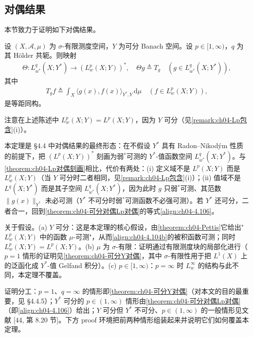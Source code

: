 \documentclass[../../main.tex]{subfiles}%
\begin{document}
\subsection{对偶结果}\label{subsection:ch04-对偶结果}

本节致力于证明如下对偶结果。

\begin{theorem}\label{theorem:ch04-弱对偶}
设 $(X,\mathcal{A},\mu)$ 为 $\sigma$-有限测度空间，$Y$ 为可分 Banach 空间。设 $p\in[1,\infty)$，$q$ 为其 Hölder 共轭。则映射
\begin{align}
\Theta:L^q_{w^*}(X;Y^*)\to(L^p_w(X;Y))^*,\quad \Theta g\triangleq T_g\quad(g\in L^q_{w^*}(X;Y^*)), \label{align:ch04-4.104a}
\end{align}
其中
\begin{align}
T_gf\triangleq\int_X\langle g(x),f(x)\rangle_{Y^*,Y}\,\mathrm{d}\mu\quad(f\in L^p_w(X;Y)), \label{align:ch04-4.104b}
\end{align}
是等距同构。
\end{theorem}

注意在上述陈述中 $L^p_w(X;Y)=L^p(X;Y)$，因为 $Y$ 可分（见\cref{remark:ch04-Lp包含}(i)）。

\begin{remark}\label{remark:ch04-弱对偶}
本定理是 §4.4 中对偶结果的最终形态：在不假设 $Y^*$ 具有 Radon--Nikodým 性质的前提下，把 $(L^p(X;Y))^*$ 刻画为弱$^*$可测的 $Y^*$-值函数空间 $L^q_{w^*}(X;Y^*)$。与\cref{theorem:ch04-Lp对偶刻画}相比，代价有两处：(i) 定义域不是 $L^p(X;Y)$ 而是 $L^p_w(X;Y)$（当 $Y$ 可分时二者相同，见\cref{remark:ch04-Lp包含}(i)）；(ii) 值域不是 $L^q(X;Y^*)$ 而是其子空间 $L^q_{w^*}(X;Y^*)$，因为此时 $g$ 只弱$^*$可测、其范数 $\|g(x)\|_{Y^*}$ 未必可测（$Y^*$ 不可分时弱$^*$可测函数不必强可测）。若 $Y^*$ 还可分，二者合一，回到\cref{theorem:ch04-可分对偶Lp对偶}的等式\eqref{align:ch04-4.106}。

关于假设。(a) $Y$ 可分：这是本定理的核心假设，由\cref{theorem:ch04-Pettis}它给出"$L^p_w(X;Y)$ 中的函数 $\mu$-可测"，从而\eqref{align:ch04-4.104b}的被积函数可测；同时 $L^p_w(X;Y)=L^p(X;Y)$。(b) $\mu$ 为 $\sigma$-有限：证明通过有限测度块的局部化进行（$p=1$ 情形的证明见\cref{theorem:ch04-可分Y对偶}，其中 $\sigma$-有限性用于把 $L^1(X)$ 上的泛函化成 $Y^*$-值 Gelfand 积分）。(c) $p\in[1,\infty)$：$p=\infty$ 时 $L^\infty_w$ 的结构与此不同，本定理不覆盖。

证明分工：$p=1$、$q=\infty$ 的情形即\cref{theorem:ch04-可分Y对偶}（对本文的目的最重要，见 §4.4.5）；$Y^*$ 可分的 $p\in(1,\infty)$ 情形由\cref{theorem:ch04-可分对偶Lp对偶}（即\eqref{align:ch04-4.106}）给出；$Y$ 可分但 $Y^*$ 不可分、$p\in(1,\infty)$ 的一般情形见文献 [44, 第 8.20 节]。下方 proof 环境把前两种情形组装起来并说明它们如何覆盖本定理。
\end{remark}
\end{document}
